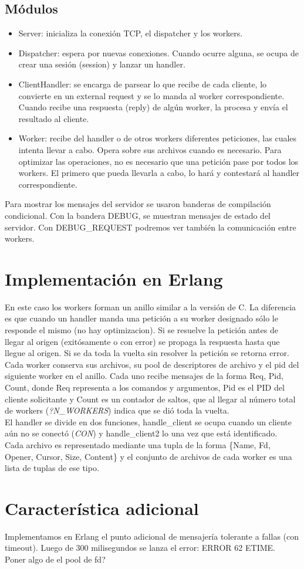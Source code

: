 \documentclass[a4paper,12pt]{article}
\begin{document}
    \subsection*{Módulos}
    \begin{itemize}
    \item Server: inicializa la conexión TCP, el dispatcher y los workers.
    \item Dispatcher: espera por nuevas conexiones. Cuando ocurre alguna, se ocupa de crear una sesión (session) y lanzar un handler.
    \item ClientHandler: se encarga de parsear lo que recibe de cada cliente, lo convierte en un external request y se lo manda al worker correspondiente. Cuando recibe una respuesta (reply) de algún worker, la procesa y envía el resultado al cliente.
    \item Worker: recibe del handler o de otros workers diferentes peticiones, las cuales intenta llevar a cabo. Opera sobre sus archivos cuando es necesario. Para optimizar las operaciones, no es necesario que una petición pase por todos los workers. El primero que pueda llevarla a cabo, lo hará y contestará al handler correspondiente.
    \end{itemize}
    Para mostrar los mensajes del servidor se usaron banderas de compilación condicional. Con la bandera DEBUG, se muestran mensajes de estado del servidor. Con DEBUG\_REQUEST podremos ver también la comunicación entre workers.
    
\section*{Implementación en Erlang}
    En este caso los workers forman un anillo similar a la versión de C. La diferencia es que cuando un handler manda una petición a su worker designado sólo le responde el mismo (no hay optimizacion). Si se resuelve la petición antes de llegar al origen (exitósamente o con error) se propaga la respuesta hasta que llegue al origen. Si se da toda la vuelta sin resolver la petición se retorna error.\\
    Cada worker conserva sus archivos, su pool de descriptores de archivo y el pid del siguiente worker en el anillo. Cada uno recibe mensajes de la forma {Req, Pid, Count}, donde Req representa a los comandos y argumentos, Pid es el PID del cliente solicitante y Count es un contador de saltos, que al llegar al número total de workers (\textit{?N\_WORKERS}) indica que se dió toda la vuelta.\\
    El handler se divide en dos funciones, handle\_client se ocupa cuando un cliente aún no se conectó (\textit{CON}) y handle\_client2 lo una vez que está identificado.\\
    Cada archivo es representado mediante una tupla de la forma \{Name, Fd, Opener, Cursor, Size, Content\} y el conjunto de archivos de cada worker es una lista de tuplas de ese tipo.

\section*{Característica adicional}
    Implementamos en Erlang el punto adicional de mensajería tolerante a fallas (con timeout). Luego de 300 milisegundos se lanza el error: ERROR 62 ETIME.\\
    
    Poner algo de el pool de fd? 
\end{document}

